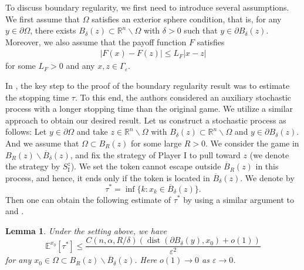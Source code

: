 \documentclass[english]{amsart}
\newcommand{\dist}{\operatorname{dist}}
\newcommand{\eps}{\varepsilon}
\theoremstyle{plain}
\newtheorem{lemma}[definition]{Lemma}
\theoremstyle{definition}
\theoremstyle{remark}
\numberwithin{equation}{section}
\begin{document}
To discuss boundary regularity, we first need to introduce several assumptions.
We first assume that $\Omega$ satisfies an exterior sphere condition, that is,
for any $y \in \partial \Omega$, there exists $ B_{\delta}(z) \subset \mathbb{R}^{n} \backslash \Omega $ with $\delta > 0 $ such that $y \in  \partial B_{\delta}(z)$.
Moreover, we also assume that the payoff function $F$ satisfies
\begin{align} \label{bdlip}
|F(x)-F(z)| \le L_F|x-z|
\end{align}
for some $L_F>0$ and any $x,z\in \Gamma_{\eps}$.

In \cite{MR3011990}, the key step to the proof of the boundary regularity result was to estimate the stopping time $\tau$. 
To this end, the authors considered an auxiliary stochastic process with a longer stopping time than the original game.
We utilize a similar approach to obtain our desired result.
Let us construct a stochastic process as follows:
Let $y \in \partial \Omega$ and take $z \in \mathbb{R}^{n} \backslash \Omega $ with $ B_{\delta}(z) \subset \mathbb{R}^{n} \backslash \Omega $ and $y \in \partial B_{\delta}(z)$. 
And we assume that $\Omega \subset B_{R}(z)$ for some large $R>0$.
We consider the game in $B_R(z)\backslash \overline{B}_{\delta}(z)$, and fix the strategy of Player I to pull toward $z$ (we denote the strategy by $S_{\textrm{I}}^z{}$). 
We set the token cannot escape outside $\overline{B}_{R}(z)$ in this process,
and hence, it ends only if the token is located in $\overline{B}_{\delta}(z)$. 
We denote by $$ \tau^{\ast} = \inf \{ k : x_{k} \in \overline{B}_{\delta}(z)  \}.$$
Then one can obtain the following estimate of $\tau^{\ast}$ by using a similar argument to \cite[Lemma 4.5]{MR3011990}
and \cite[Lemma 5.2]{MR4299842}.  
\begin{lemma} \label{estauxsp} 
Under the setting above, we have
$$ \mathbb{E}^{x_{0}}[\tau^{\ast}] \le    \frac{C(n, \alpha,  R/\delta)( \dist(\partial B_{\delta}(y),x_{0})+o(1))}{\eps^{2}}   $$
for any $ x_{0}  \in \Omega  \subset  B_{R}(z)\backslash \overline{B}_{\delta}(z) $.
Here $o(1) \to 0$ as $\eps \to 0$.
\end{lemma} 
\end{document}
